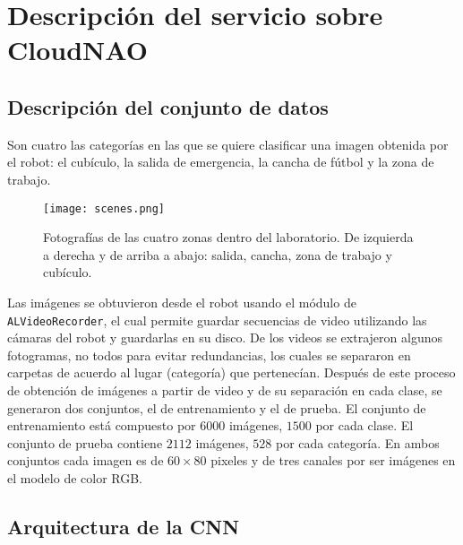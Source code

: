 %
%
%

\section{Descripción del servicio sobre CloudNAO}


\subsection{Descripción del conjunto de datos\label{sec:dataset-def}}

Son cuatro las categorías en las que se quiere
clasificar una imagen obtenida por el robot: el cubículo,
la salida de emergencia, la cancha de fútbol y la zona de trabajo.

\begin{figure}[ht]
    \centering
    \texttt{[image: scenes.png]}
    \caption{Fotografías de las cuatro zonas dentro del laboratorio. De izquierda a derecha y
    de arriba a abajo: salida, cancha, zona de trabajo y cubículo.
    }
    \label{fig:scenes}
\end{figure}

Las imágenes se obtuvieron desde el robot usando el módulo de
\texttt{ALVideoRecorder},
el cual permite guardar secuencias de video utilizando las cámaras del robot y guardarlas 
en su disco. De los videos se extrajeron algunos fotogramas, no todos para evitar
redundancias, los cuales se separaron en carpetas
de acuerdo al lugar (categoría) que pertenecían. Después de este proceso
de obtención de imágenes a partir de video y de su separación en cada clase, se
generaron dos conjuntos, el de entrenamiento y el de prueba. El conjunto 
de entrenamiento está compuesto por $6000$ imágenes, $1500$ por cada clase.
El conjunto de prueba contiene $2112$ imágenes, $528$ por cada categoría.
En ambos conjuntos cada imagen es de $60 \times  80$ pixeles y de tres canales por ser imágenes en el modelo de color RGB.



\subsection{Arquitectura de la CNN}

